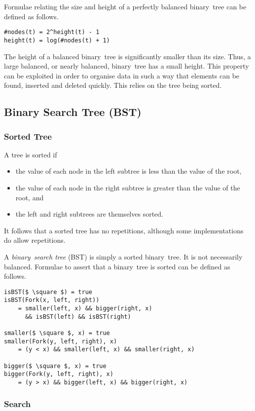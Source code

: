 Formulae relating the size and height of a perfectly balanced binary~tree can be defined as follows.
\begin{lstlisting}[mathescape=true]
#nodes(t) = 2^height(t) - 1
height(t) = log(#nodes(t) + 1)
\end{lstlisting}

The height of a balanced binary~tree is significantly smaller than its size.
Thus, a large balanced, or nearly balanced, binary~tree has a small height.
This property can be exploited in order to organise data in such a way that elements can be found, inserted and deleted quickly.
This relies on the tree being sorted.

\subsection{Binary Search Tree (BST)}

\subsubsection{Sorted Tree}

A tree is sorted if
\begin{itemize}
  \item the value of each node in the left subtree is less than the value of the root,
  \item the value of each node in the right subtree is greater than the value of the root, and
  \item the left and right subtrees are themselves sorted.
\end{itemize}
It follows that a sorted tree has no repetitions, although some implementations do allow repetitions.

A \emph{binary~search tree} (BST) is simply a sorted binary~tree.
It is not necessarily balanced.
Formulae to assert that a binary~tree is sorted can be defined as follows.
\begin{lstlisting}[mathescape=true]
isBST($ \square $) = true
isBST(Fork(x, left, right))
    = smaller(left, x) && bigger(right, x)
      && isBST(left) && isBST(right)

smaller($ \square $, x) = true
smaller(Fork(y, left, right), x)
    = (y < x) && smaller(left, x) && smaller(right, x)

bigger($ \square $, x) = true
bigger(Fork(y, left, right), x)
    = (y > x) && bigger(left, x) && bigger(right, x)
\end{lstlisting}

\subsubsection{Search}

